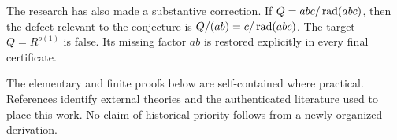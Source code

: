 The research has also made a substantive correction. If $Q=abc/\operatorname{rad}(abc)$, then the defect relevant to the conjecture is $Q/(ab)=c/\operatorname{rad}(abc)$. The target $Q=R^{o(1)}$ is false. Its missing factor $ab$ is restored explicitly in every final certificate.

The elementary and finite proofs below are self-contained where practical. References identify external theories and the authenticated literature used to place this work. No claim of historical priority follows from a newly organized derivation.
\clearpage
